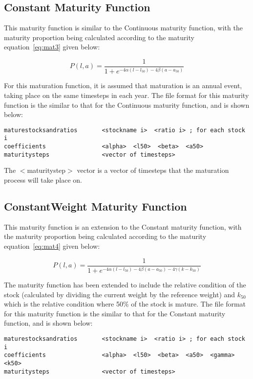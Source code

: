 \documentclass [a4paper, 10pt]{book}
\begin{document}
\subsection{Constant Maturity Function}
This maturity function is similar to the Continuous maturity function, with the maturity proportion being calculated according to the maturity equation~\ref{eq:mat3} given below:

\begin{equation}\label{eq:mat3}
P(l, a) = \frac{1}{ 1 + e^{-4\alpha(l - l_{50}) -4\beta(a - a_{50})}}
\end{equation}

For this maturation function, it is assumed that maturation is an annual event, taking place on the same timesteps in each year.  The file format for this maturity function is the similar to that for the Continuous maturity function, and is shown below:

{\small\begin{verbatim}
maturestocksandratios       <stockname i>  <ratio i> ; for each stock i
coefficients                <alpha>  <l50>  <beta>  <a50>
maturitysteps               <vector of timesteps>
\end{verbatim}}

The $<$maturitystep$>$ vector is a vector of timesteps that the maturation process will take place on.

\subsection{ConstantWeight Maturity Function}
This maturity function is an extension to the Constant maturity function, with the maturity proportion being calculated according to the maturity equation~\ref{eq:mat4} given below:

\begin{equation}\label{eq:mat4}
P(l, a) = \frac{1}{ 1 + e^{-4\alpha(l - l_{50}) -4\beta(a - a_{50}) -4\gamma(k - k_{50})}}
\end{equation}

The maturity function has been extended to include the relative condition of the stock (calculated by dividing the current weight by the reference weight) and $k_{50}$ which is the relative condition where 50\% of the stock is mature.  The file format for this maturity function is the similar to that for the Constant maturity function, and is shown below:

{\small\begin{verbatim}
maturestocksandratios       <stockname i>  <ratio i> ; for each stock i
coefficients                <alpha>  <l50>  <beta>  <a50>  <gamma>  <k50>
maturitysteps               <vector of timesteps>
\end{verbatim}}
\end{document}
